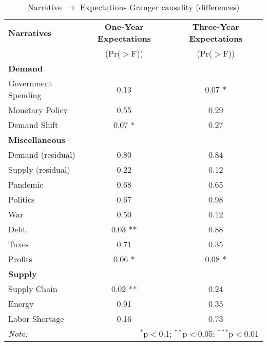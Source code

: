 \begin{table}[ht]
\centering
\caption{Narrative $\rightarrow$ Expectations Granger causality (differences)}\label{tab:granger_diff}

\begin{tabular}{lcc}
\toprule
\textbf{Narratives} & \textbf{One-Year Expectations} & \textbf{Three-Year Expectations} \\
& (Pr($>$F)) & (Pr($>$F)) \\
\midrule
\multicolumn{3}{l}{\textbf{Demand}} \\
\midrule
Government Spending & 0.13 & 0.07 * \\
Monetary Policy & 0.55 & 0.29 \\
Demand Shift & 0.07 * & 0.27 \\
\midrule
\multicolumn{3}{l}{\textbf{Miscellaneous}} \\
\midrule
Demand (residual) & 0.80 & 0.84 \\
Supply (residual) & 0.22 & 0.12 \\
Pandemic & 0.68 & 0.65 \\
Politics & 0.67 & 0.98 \\
War & 0.50 & 0.12 \\
Debt & 0.03 ** & 0.88 \\
Taxes & 0.71 & 0.35 \\
Profits & 0.06 * & 0.08 * \\
\midrule
\multicolumn{3}{l}{\textbf{Supply}} \\
\midrule
Supply Chain & 0.02 ** & 0.24 \\
Energy & 0.91 & 0.35 \\
Labor Shortage & 0.16 & 0.73 \\
\midrule
\bottomrule
\textit{Note:}  & \multicolumn{2}{r}{$^{*}$p$<$0.1; $^{**}$p$<$0.05; $^{***}$p$<$0.01} \\
\bottomrule
\end{tabular}
\end{table}
